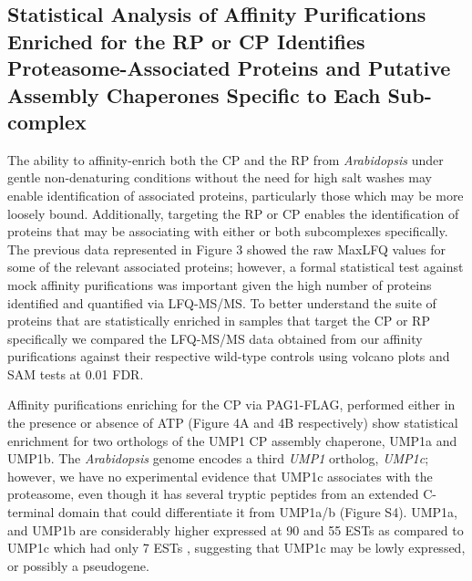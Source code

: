 \subsection{Statistical Analysis of Affinity Purifications Enriched for the RP or CP Identifies Proteasome-Associated Proteins and Putative Assembly Chaperones Specific to Each Sub-complex}
	The ability to affinity-enrich both the CP and the RP from \textit{Arabidopsis} under gentle non-denaturing conditions without the need for high salt washes may enable identification of associated proteins, particularly those which may be more loosely bound. Additionally, targeting the RP or CP enables the identification of proteins that may be associating with either or both subcomplexes specifically. The previous data represented in Figure 3 showed the raw MaxLFQ values for some of the relevant associated proteins; however, a formal statistical test against mock affinity purifications was important given the high number of proteins identified and quantified via LFQ-MS/MS. To better understand the suite of proteins that are statistically enriched in samples that target the CP or RP specifically we compared the LFQ-MS/MS data obtained from our affinity purifications against their respective wild-type controls using volcano plots and SAM tests at 0.01 FDR.
	
Affinity purifications enriching for the CP via PAG1-FLAG, performed either in the presence or absence of ATP (Figure 4A and 4B respectively) show statistical enrichment for two orthologs of the UMP1 CP assembly chaperone, UMP1a and UMP1b. The \textit{Arabidopsis} genome encodes a third \textit{UMP1} ortholog, \textit{UMP1c}; however, we have no experimental evidence that UMP1c associates with the proteasome, even though it has several tryptic peptides from an extended C-terminal domain that could differentiate it from UMP1a/b (Figure S4). UMP1a, and UMP1b are considerably higher expressed at 90 and 55 ESTs as compared to UMP1c which had only 7 ESTs \citep{berardini15}, suggesting that UMP1c may be lowly expressed, or possibly a pseudogene. 


